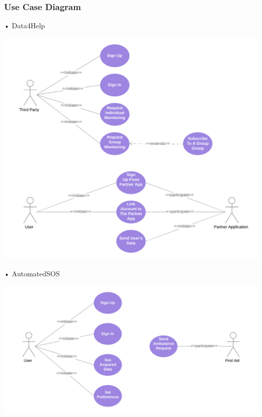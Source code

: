 \subsubsection{Use Case Diagram}
\begin{enumerate}
\begin{minipage}{\textwidth}
\FloatBarrier
\item[•]{\Large Data4Help}

\begin{center}
\includegraphics[scale=0.65]{Images/UseCaseDiagrams/Data4HelpUseCaseDiagram.png}
\end{center}
\FloatBarrier
\end{minipage}


\begin{minipage}{\textwidth}
\item[•]{\Large AutomatedSOS}
\FloatBarrier
\begin{center}
\includegraphics[scale=0.65]{Images/UseCaseDiagrams/AutomatedSOSCaseDiagram.png}
\end{center}
\FloatBarrier
\end{minipage}


\end{enumerate}
